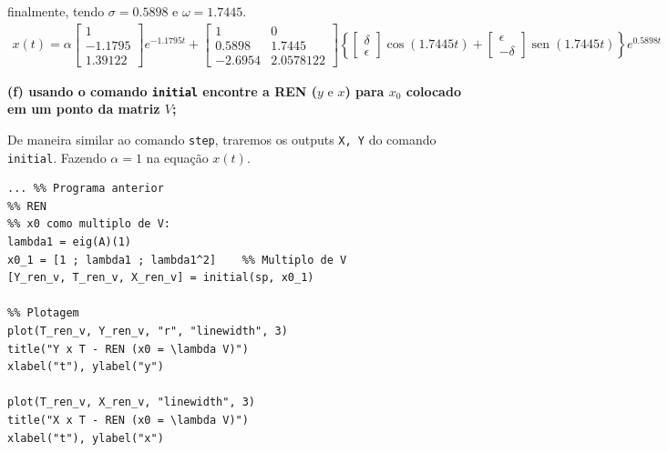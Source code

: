 \documentclass[11pt]{article}
\DeclareMathOperator{\sen}{sen}
\begin{document}
finalmente, tendo $\sigma = 0.5898$ e $\omega = 1.7445$.
\begin{align*}
  x(t) = \alpha
  \begin{bmatrix}
    1\\
    -1.1795\\
    1.39122
  \end{bmatrix}
  e^{-1.1795 t} + 
  \begin{bmatrix}
    1 & 0\\
    0.5898 & 1.7445\\
    -2.6954& 2.0578122
  \end{bmatrix}
  \left\{
    \begin{bmatrix}
      \delta\\
      \epsilon
    \end{bmatrix}
    \cos(1.7445 t) +
    \begin{bmatrix}
      \epsilon\\
      -\delta
    \end{bmatrix}
    \sen(1.7445 t)
  \right\}
  e^{0.5898 t}
\end{align*}

\textbf{(f) usando o comando \texttt{initial} encontre a REN ($y \text{ e } x$) para $x_0$ colocado em um ponto da matriz $V$;}

De maneira similar ao comando \texttt{step}, traremos os outputs \texttt{X, Y} do comando \texttt{initial}. Fazendo $\alpha = 1$ na equação $x(t)$.
\begin{verbatim}
... %% Programa anterior
%% REN
%% x0 como multiplo de V:
lambda1 = eig(A)(1)
x0_1 = [1 ; lambda1 ; lambda1^2]    %% Multiplo de V
[Y_ren_v, T_ren_v, X_ren_v] = initial(sp, x0_1)

%% Plotagem
plot(T_ren_v, Y_ren_v, "r", "linewidth", 3)
title("Y x T - REN (x0 = \lambda V)")
xlabel("t"), ylabel("y")

plot(T_ren_v, X_ren_v, "linewidth", 3)
title("X x T - REN (x0 = \lambda V)")
xlabel("t"), ylabel("x")
\end{verbatim}
\end{document}
